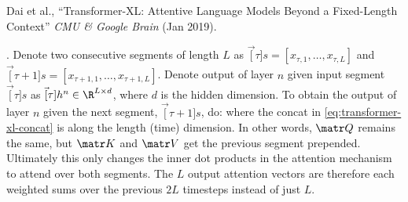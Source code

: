 \documentclass[11pt]{article}
\begin{document}
\vspace{-1em}
{\footnotesize Dai et al., ``Transformer-XL: Attentive Language Models Beyond a Fixed-Length Context'' \textit{CMU \& Google Brain} (Jan 2019).}


. Denote two consecutive segments of length $L$ as $\vec[\tau]{s} = [x_{\tau, 1}, \ldots, x_{\tau, L}]$ and $\vec[\tau + 1]{s} = [x_{\tau +1, 1}, \ldots, x_{\tau + 1, L}]$. Denote output of layer $n$ given input segment $\vec[\tau]{s}$ as $\vec[\tau]{h}^n \in \R^{L \times d}$, where $d$ is the hidden dimension. To obtain the output of layer $n$ given the next segment, $\vec[\tau + 1]{s}$, do:
where the concat in \ref{eq:transformer-xl-concat} is along the length (time) dimension. In other words, $\matr Q$ remains the same, but $\matr K$ and $\matr V$ get the previous segment prepended. Ultimately this only changes the inner dot products in the attention mechanism to attend over both segments. The $L$ output attention vectors are therefore each weighted sums over the previous $2L$ timesteps instead of just $L$. 
\end{document}

